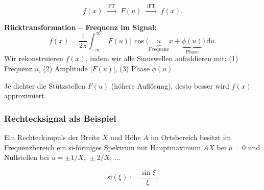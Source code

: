 \documentclass[12pt, a4paper]{article}
\begin{document}
\[
  f(x)\;\xrightarrow{\;\mathrm{FT}\;}\;F(u)
       \;\xrightarrow{\;\mathrm{iFT}\;}\;f(x).
\]

\textbf{Rücktransformation -- Frequenz im Signal:}
\[
  f(x) = \frac{1}{2\pi}\int_{-\infty}^{\infty}
  |F(u)|\,\cos\bigl(\underbrace{u}_{\text{Frequenz}}x
  + \underbrace{\phi(u)}_{\text{Phase}}\bigr)\,\mathrm{d}u.
\]
Wir rekonstruieren $f(x)$, indem wir alle Sinuswellen aufaddieren mit:
(1) Frequenz $u$, (2) Amplitude $|F(u)|$, (3) Phase $\phi(u)$.

Je dichter die Stützstellen $F(u)$ (höhere Auflösung), desto besser wird
$f(x)$ approximiert.

\subsubsection{Rechtecksignal als Beispiel}

Ein Rechteckimpuls der Breite $X$ und Höhe $A$ im Ortsbereich besitzt
im Frequenzbereich ein si-förmiges Spektrum mit Hauptmaximum $AX$ bei
$u=0$ und Nullstellen bei $u = \pm 1/X,\, \pm 2/X,\, \ldots$

\[
  \mathrm{si}(\xi) := \frac{\sin\xi}{\xi}.
\]
\end{document}
